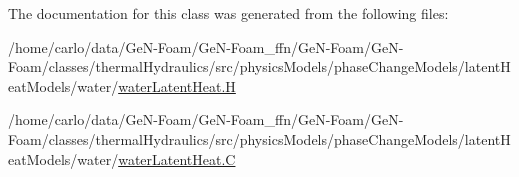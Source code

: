 The documentation for this class was generated from the following files\+:\begin{DoxyCompactItemize}
\item 
/home/carlo/data/\+Ge\+N-\/\+Foam/\+Ge\+N-\/\+Foam\+\_\+ffn/\+Ge\+N-\/\+Foam/\+Ge\+N-\/\+Foam/classes/thermal\+Hydraulics/src/physics\+Models/phase\+Change\+Models/latent\+Heat\+Models/water/\hyperlink{waterLatentHeat_8H}{water\+Latent\+Heat.\+H}\item 
/home/carlo/data/\+Ge\+N-\/\+Foam/\+Ge\+N-\/\+Foam\+\_\+ffn/\+Ge\+N-\/\+Foam/\+Ge\+N-\/\+Foam/classes/thermal\+Hydraulics/src/physics\+Models/phase\+Change\+Models/latent\+Heat\+Models/water/\hyperlink{waterLatentHeat_8C}{water\+Latent\+Heat.\+C}\end{DoxyCompactItemize}
